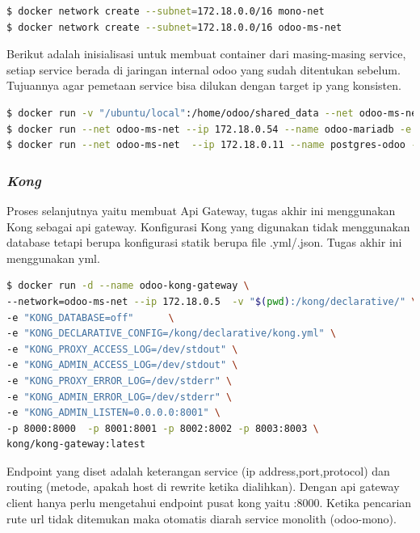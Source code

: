 \begin{lstlisting}[style=mystyle, language=sh, caption={Shell Script untuk pembuatan jaringan }]
$ docker network create --subnet=172.18.0.0/16 mono-net
$ docker network create --subnet=172.18.0.0/16 odoo-ms-net	
\end{lstlisting} 

Berikut adalah inisialisasi untuk membuat container dari masing-masing service, setiap service berada di jaringan internal odoo yang sudah ditentukan sebelum. Tujuannya agar pemetaan service bisa dilukan dengan target ip yang konsisten.

\begin{lstlisting}[style=mystyle, language=sh, caption={Shell Script untuk pembuatan container }]
$ docker run -v "/ubuntu/local":/home/odoo/shared_data --net odoo-ms-net  --ip 172.18.0.55 --name odoo-mono -p :8069  -d odoo-mono
$ docker run --net odoo-ms-net --ip 172.18.0.54 --name odoo-mariadb -e MYSQL_ROOT_PASSWORD=mariadb -p 3306:3306 -d mariadb 
$ docker run --net odoo-ms-net  --ip 172.18.0.11 --name postgres-odoo -e POSTGRES_PASSWORD=postgres -p 5432:5432 -d postgres
\end{lstlisting} 

\subsubsection{\textit{Kong}}
Proses selanjutnya yaitu membuat Api Gateway, tugas akhir ini menggunakan Kong sebagai api gateway. Konfigurasi Kong yang digunakan tidak menggunakan database tetapi berupa konfigurasi statik berupa file .yml/.json. Tugas akhir ini menggunakan yml.

\begin{lstlisting}[style=mystyle, language=sh, caption={Shell Script untuk pembuatan container }]
$ docker run -d --name odoo-kong-gateway \
--network=odoo-ms-net --ip 172.18.0.5  -v "$(pwd):/kong/declarative/" \
-e "KONG_DATABASE=off" 		\
-e "KONG_DECLARATIVE_CONFIG=/kong/declarative/kong.yml" \
-e "KONG_PROXY_ACCESS_LOG=/dev/stdout" \
-e "KONG_ADMIN_ACCESS_LOG=/dev/stdout" \		
-e "KONG_PROXY_ERROR_LOG=/dev/stderr" \
-e "KONG_ADMIN_ERROR_LOG=/dev/stderr" \
-e "KONG_ADMIN_LISTEN=0.0.0.0:8001" \
-p 8000:8000  -p 8001:8001 -p 8002:8002 -p 8003:8003 \
kong/kong-gateway:latest 
\end{lstlisting} 

Endpoint yang diset adalah keterangan service (ip address,port,protocol) dan routing (metode, apakah host di rewrite ketika dialihkan). Dengan api gateway client hanya perlu mengetahui endpoint pusat kong yaitu :8000. Ketika pencarian rute url tidak ditemukan maka otomatis diarah service monolith (odoo-mono).

